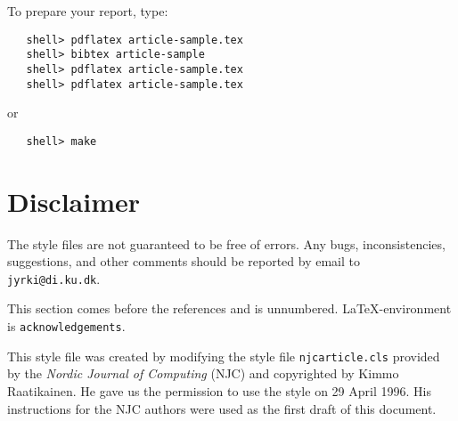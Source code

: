 \documentclass{DIKU-report}[2006/05/09]
\begin{document}
\noindent
To prepare your report, type:
\begin{verbatim}
   shell> pdflatex article-sample.tex
   shell> bibtex article-sample
   shell> pdflatex article-sample.tex
   shell> pdflatex article-sample.tex
\end{verbatim}
or
\begin{verbatim}
   shell> make
\end{verbatim}
 
\section{Disclaimer}

The style files are not guaranteed to be free of errors.  Any bugs,
inconsistencies, suggestions, and other comments should be reported by
email to \texttt{jyrki@di.ku.dk}.

\begin{acknowledgements}

This section comes before the references and is unnumbered.
\LaTeX-en\-viron\-ment is \verb|acknowledgements|.

This style file was created by modifying the style file
\texttt{njcarticle.cls} provided by the \textit{Nordic Journal of
  Computing} (NJC) and copyrighted by Kimmo Raatikainen. He gave us
the permission to use the style on 29 April 1996. His instructions for
the NJC authors were used as the first draft of this document.
\end{acknowledgements}

\nocite{mowgli-overview,Raatikainen-1994a,Raatikainen-1994b}

\end{document}
